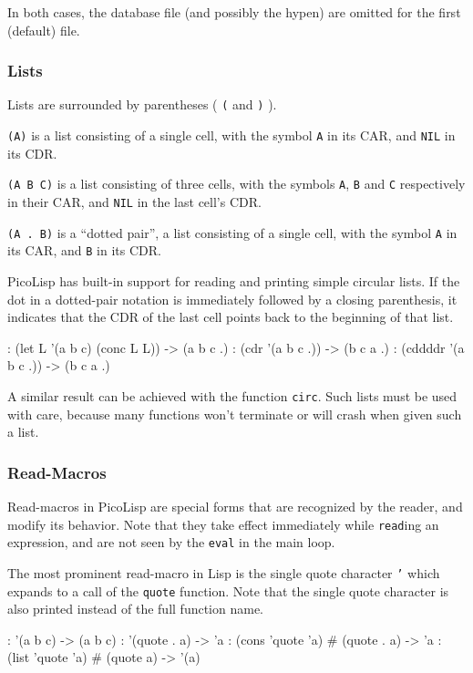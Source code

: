In both cases, the database file (and possibly the hypen) are omitted
for the first (default) file.

 
\subsubsection{Lists}
\label{sec:refm-lists}%
Lists are surrounded by parentheses ( \texttt{(}  and  \texttt{)} ).

\texttt{(A)} is a list consisting of a single cell, with the symbol \texttt{A} in its
CAR, and \texttt{NIL} in its CDR.

\texttt{(A B C)} is a list consisting of three cells, with the symbols \texttt{A}, \texttt{B}
and \texttt{C} respectively in their CAR, and \texttt{NIL} in the last cell's CDR.

\texttt{(A . B)} is a ``dotted pair'', a list consisting of a single cell, with
the symbol \texttt{A} in its CAR, and \texttt{B} in its CDR.

PicoLisp has built-in support for reading and printing simple circular
lists. If the dot in a dotted-pair notation is immediately followed by a
closing parenthesis, it indicates that the CDR of the last cell points
back to the beginning of that list.


\begin{wideverbatim}
: (let L '(a b c) (conc L L))
-> (a b c .)
: (cdr '(a b c .))
-> (b c a .)
: (cddddr '(a b c .))
-> (b c a .)
\end{wideverbatim}

A similar result can be achieved with the function \texttt{circ}. Such lists
must be used with care, because many functions won't terminate or will
crash when given such a list.

\subsubsection{Read-Macros}
\label{sec:refm-read-macros}%
Read-macros in PicoLisp are special forms that are recognized by the
reader, and modify its behavior. Note that they take effect immediately
while  \texttt{read}ing an expression, and are not seen by the \texttt{eval} in the
main loop.

The most prominent read-macro in Lisp is the single quote character \texttt{'} 
which expands to a call of the \texttt{quote} function. Note that the single
quote character is also printed instead of the full function name.


\begin{wideverbatim}
: '(a b c)
-> (a b c)
: '(quote . a)
-> 'a
: (cons 'quote 'a)   # (quote . a)
-> 'a
: (list 'quote 'a)   # (quote a)
-> '(a)
\end{wideverbatim}

